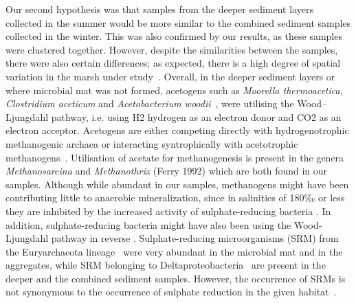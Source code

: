    Our second hypothesis was that samples from the deeper sediment layers collected in the summer would be more similar to 
   the combined sediment samples collected in the winter. 
   This was also confirmed by our results, as these samples were clustered together. 
   However, despite the similarities between the samples, there were also certain differences; 
   as expected, there is a high degree of spatial variation in the marsh under study~\citep{dillon_spatial_2009}. 
   Overall, in the deeper sediment layers or where microbial mat was not formed, acetogens such as 
   \textit{Moorella thermoacetica}, \textit{Clostridium aceticum} and \textit{Acetobacterium woodii}~\citep{schuchmann_energetics_2016}, 
   were utilising the Wood–Ljungdahl pathway, i.e. using H2 hydrogen as an electron donor and CO2 as an electron acceptor. 
   Acetogens are either competing directly with hydrogenotrophic methanogenic archaea or interacting syntrophically 
   with acetotrophic methanogens~\citep{ragsdale_acetogenesis_2008}. 
   Utilisation of acetate for methanogenesis is present in the genera \textit{Methanosarcina} and \textit{Methanothrix} (Ferry 1992) 
   which are both found in our samples. 
   Although while abundant in our samples, methanogens might have been contributing little to anaerobic mineralization, 
   since in salinities of 180‰ or less they are inhibited by the increased activity of sulphate-reducing bacteria 
   \citep{sorensen_salinity_2004}. 
   In addition, sulphate-reducing bacteria might have also been using the Wood-Ljungdahl pathway in reverse 
   \citep{ragsdale_acetogenesis_2008}. 
   Sulphate-reducing microorganisms (SRM) from the Euryarchaeota lineage~\citep{muyzer_ecology_2008} were very abundant 
   in the microbial mat and in the aggregates, while SRM belonging to Deltaproteobacteria~\citep{muyzer_ecology_2008} 
   are present  in the deeper and the combined sediment samples. 
   However, the occurrence of SRMs is not synonymous to the occurrence of sulphate reduction in the given habitat~\citep{muyzer_ecology_2008}.


